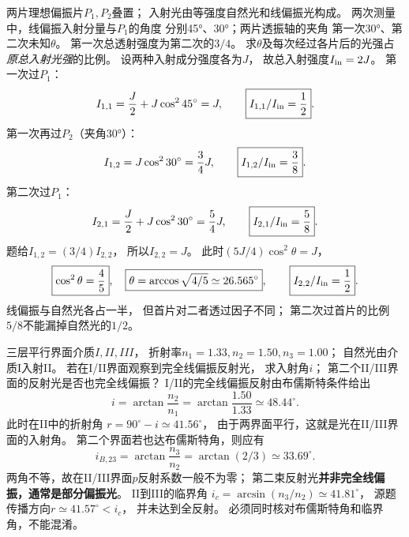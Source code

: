 \problemtext 两片理想偏振片$P_1,P_2$叠置；
入射光由等强度自然光和线偏振光构成。
两次测量中，线偏振入射分量与$P_1$的角度
分别45°、30°；两片透振轴的夹角
第一次30°、第二次未知$\theta$。
第一次总透射强度为第二次的$3/4$。
求$\theta$及每次经过各片后的光强占\emph{原总入射光强}的比例。
\workings
设两种入射成分强度各为$J$，
故总入射强度$I_{\rm in}=2J$。
第一次过$P_1$：
\[
 I_{1,1}=\frac J2+J\cos^245^\circ=J,
 \qquad\boxed{I_{1,1}/I_{\rm in}=\frac12}.
\]
第一次再过$P_2$（夹角30°）：
\[
 I_{1,2}=J\cos^230^\circ=\frac34J,
 \qquad\boxed{I_{1,2}/I_{\rm in}=\frac38}.
\]
第二次过$P_1$：
\[
 I_{2,1}=\frac J2+J\cos^230^\circ
 =\frac54J,\qquad
 \boxed{I_{2,1}/I_{\rm in}=\frac58}.
\]
题给$I_{1,2}=(3/4)I_{2,2}$，
所以$I_{2,2}=J$。
此时$(5J/4)\cos^2\theta=J$，
\[
\boxed{\cos^2\theta=\frac45},\quad
\boxed{\theta=\arccos\sqrt{4/5}
\simeq26.565^\circ},\qquad
\boxed{I_{2,2}/I_{\rm in}=\frac12}.
\]
\crosscheck 线偏振与自然光各占一半，
但首片对二者透过因子不同；
第二次过首片的比例$5/8$不能漏掉自然光的$1/2$。

\problemtext 三层平行界面介质$I,II,III$，
折射率$n_1=1.33,n_2=1.50,n_3=1.00$；
自然光由介质I入射II。
若在I/II界面观察到完全线偏振反射光，
求入射角$i$；
第二个II/III界面的反射光是否也完全线偏振？
\workings
I/II的完全线偏振反射由布儒斯特条件给出
\[
\boxed{i=\arctan\frac{n_2}{n_1}
=\arctan\frac{1.50}{1.33}\simeq48.44^\circ}.
\]
此时在II中的折射角
$r=90^\circ-i\simeq41.56^\circ$，
由于两界面平行，这就是光在II/III界面的入射角。
第二个界面若也达布儒斯特角，则应有
\[
 i_{B,23}=\arctan\frac{n_3}{n_2}
 =\arctan(2/3)\simeq33.69^\circ.
\]
两角不等，故在II/III界面$p$反射系数一般不为零；
第二束反射光\textbf{并非完全线偏振，通常是部分偏振光}。
\crosscheck II到III的临界角
$i_c=\arcsin(n_3/n_2)\simeq41.81^\circ$，
源题传播方向$r\simeq41.57^\circ<i_c$，
并未达到全反射。
必须同时核对布儒斯特角和临界角，不能混淆。
